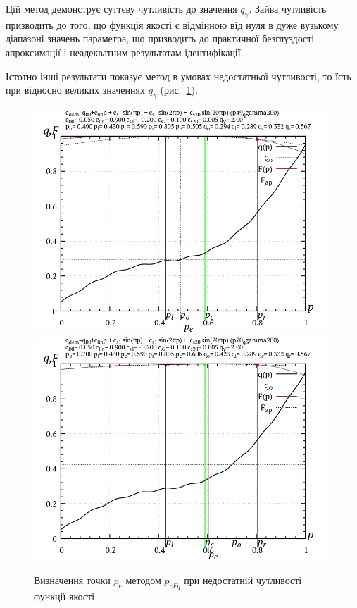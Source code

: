 Цій метод демонструє суттєву чутливість до значення $q_\gamma$.
Зайва чутливість призводить до того, що функція якості є відмінною від нуля в
дуже вузькому діапазоні значень параметра, що призводить до практичної
безглуздості апроксимації і неадекватним результатам
ідентифікації.

Істотно інші результати показує метод в умовах недостатньої
чутливості, то їсть при відносно великих значеннях
$ q_\gamma $ (рис.~\ref{atu:f:p_eFq_intra_200}).

\begin{figure}[htb!]
  \begin{center}
    \includegraphics[width=49\TW]{p/p_eFq/q_p_eFq_p49_qgamma200.png}
    \hfill
    \includegraphics[width=49\TW]{p/p_eFq/q_p_eFq_p70_qgamma200.png}
  \end{center}
\caption{Визначення точки $ p_e $ методом $p_{eFq}$ при недостатній чутливості функції якості}
\label{atu:f:p_eFq_intra_200}
\end{figure}

